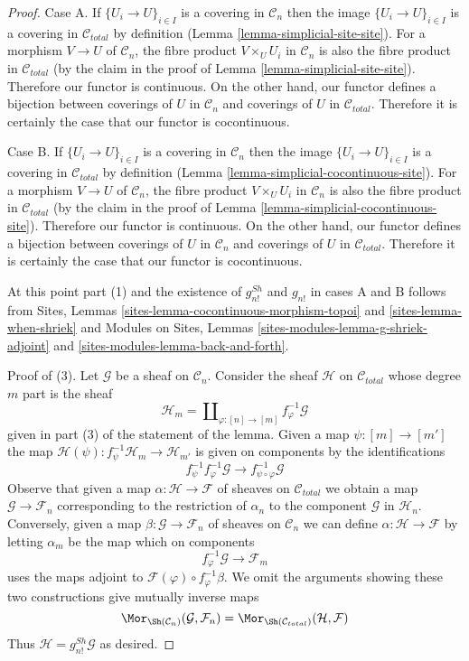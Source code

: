 \begin{proof}
Case A. If $\{U_i \to U\}_{i \in I}$ is a covering in $\mathcal{C}_n$
then the image $\{U_i \to U\}_{i \in I}$ is a covering in $\mathcal{C}_{total}$
by definition (Lemma \ref{lemma-simplicial-site-site}). For a morphism
$V \to U$ of $\mathcal{C}_n$, the fibre product
$V \times_U U_i$ in $\mathcal{C}_n$ is also
the fibre product in $\mathcal{C}_{total}$ (by the claim in the
proof of Lemma \ref{lemma-simplicial-site-site}).
Therefore our functor is continuous. On the other hand, our functor
defines a bijection between coverings of $U$ in $\mathcal{C}_n$
and coverings of $U$ in $\mathcal{C}_{total}$. Therefore it is
certainly the case that our functor is cocontinuous.

\medskip\noindent
Case B. If $\{U_i \to U\}_{i \in I}$ is a covering in $\mathcal{C}_n$
then the image $\{U_i \to U\}_{i \in I}$ is a covering in $\mathcal{C}_{total}$
by definition (Lemma \ref{lemma-simplicial-cocontinuous-site}). For a morphism
$V \to U$ of $\mathcal{C}_n$, the fibre product
$V \times_U U_i$ in $\mathcal{C}_n$ is also
the fibre product in $\mathcal{C}_{total}$ (by the claim in the
proof of Lemma \ref{lemma-simplicial-cocontinuous-site}).
Therefore our functor is continuous. On the other hand, our functor
defines a bijection between coverings of $U$ in $\mathcal{C}_n$
and coverings of $U$ in $\mathcal{C}_{total}$. Therefore it is
certainly the case that our functor is cocontinuous.

\medskip\noindent
At this point part (1) and the existence of $g^{Sh}_{n!}$ and $g_{n!}$
in cases A and B follows from
Sites, Lemmas \ref{sites-lemma-cocontinuous-morphism-topoi} and
\ref{sites-lemma-when-shriek}
and
Modules on Sites, Lemmas \ref{sites-modules-lemma-g-shriek-adjoint} and
\ref{sites-modules-lemma-back-and-forth}.

\medskip\noindent
Proof of (3). Let $\mathcal{G}$ be a sheaf on $\mathcal{C}_n$.
Consider the sheaf $\mathcal{H}$ on $\mathcal{C}_{total}$
whose degree $m$ part is the sheaf
$$
\mathcal{H}_m = \coprod\nolimits_{\varphi : [n] \to [m]}
f_\varphi^{-1}\mathcal{G}
$$
given in part (3) of the statement of the lemma.
Given a map $\psi : [m] \to [m']$ the map
$\mathcal{H}(\psi) : f_\psi^{-1}\mathcal{H}_m \to \mathcal{H}_{m'}$
is given on components by the identifications
$$
f_\psi^{-1} f_\varphi^{-1} \mathcal{G} \to
f_{\psi \circ \varphi}^{-1}\mathcal{G}
$$
Observe that given a map $\alpha : \mathcal{H} \to \mathcal{F}$
of sheaves on $\mathcal{C}_{total}$ we obtain a map
$\mathcal{G} \to \mathcal{F}_n$
corresponding to the restriction of $\alpha_n$ to the component
$\mathcal{G}$ in $\mathcal{H}_n$. Conversely, given a map
$\beta : \mathcal{G} \to \mathcal{F}_n$ of sheaves on $\mathcal{C}_n$
we can define
$\alpha : \mathcal{H} \to \mathcal{F}$ by letting $\alpha_m$
be the map which on components
$$
f_\varphi^{-1}\mathcal{G} \to \mathcal{F}_m
$$
uses the maps adjoint to $\mathcal{F}(\varphi) \circ f_\varphi^{-1}\beta$.
We omit the arguments showing these two constructions give
mutually inverse maps
$$
\Mor_{\Sh(\mathcal{C}_n)}(\mathcal{G}, \mathcal{F}_n) =
\Mor_{\Sh(\mathcal{C}_{total})}(\mathcal{H}, \mathcal{F})
$$
Thus $\mathcal{H} = g^{Sh}_{n!}\mathcal{G}$ as desired.


\end{proof}
